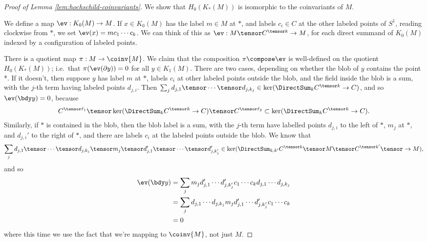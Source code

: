 \begin{proof}[Proof of Lemma \ref{lem:hochschild-coinvariants}]
We show that $H_0(K_*(M))$ is isomorphic to the coinvariants of $M$.

We define a map $\ev: K_0(M) \to M$.
If $x \in K_0(M)$ has the label $m \in M$ at $*$, and labels $c_i \in C$ at the other 
labeled points of $S^1$, reading clockwise from $*$,
we set $\ev(x) = m c_1 \cdots c_k$.
We can think of this as $\ev : M \tensor C^{\tensor k} \to M$, for each direct summand of 
$K_0(M)$ indexed by a configuration of labeled points.

There is a quotient map $\pi: M \to \coinv{M}$.
We claim that the composition $\pi \compose \ev$ is well-defined on the quotient $H_0(K_*(M))$; 
i.e.\ that $\pi(\ev(\bd y)) = 0$ for all $y \in K_1(M)$.
There are two cases, depending on whether the blob of $y$ contains the point *.
If it doesn't, then
suppose $y$ has label $m$ at $*$, labels $c_i$ at other labeled points outside the blob, 
and the field inside the blob is a sum, with the $j$-th term having
labeled points $d_{j,i}$.
Then $\sum_j d_{j,1} \tensor \cdots \tensor d_{j,k_j} \in \ker(\DirectSum_k C^{\tensor k} \to C)$, and so
$\ev(\bdy y) = 0$, because $$C^{\tensor \ell_1} \tensor \ker(\DirectSum_k C^{\tensor k} \to C) \tensor C^{\tensor \ell_2} \subset \ker(\DirectSum_k C^{\tensor k} \to C).$$
Similarly, if $*$ is contained in the blob, then the blob label is a sum, with the 
$j$-th term have labelled points $d_{j,i}$ to the left of $*$, $m_j$ at $*$, and $d_{j,i}'$ to the right of $*$,
and there are labels $c_i$ at the labeled points outside the blob.
We know that
$$\sum_j d_{j,1} \tensor \cdots \tensor d_{j,k_j} \tensor m_j \tensor d_{j,1}' \tensor \cdots \tensor d_{j,k'_j}' \in \ker(\DirectSum_{k,k'} C^{\tensor k} \tensor M \tensor C^{\tensor k'} \tensor \to M),$$
and so
\begin{align*}
\ev(\bdy y) & = \sum_j m_j d_{j,1}' \cdots d_{j,k'_j}' c_1 \cdots c_k d_{j,1} \cdots d_{j,k_j} \\
            & = \sum_j d_{j,1} \cdots d_{j,k_j} m_j d_{j,1}' \cdots d_{j,k'_j}' c_1 \cdots c_k \\
            & = 0
\end{align*}
where this time we use the fact that we're mapping to $\coinv{M}$, not just $M$.


\end{proof}
